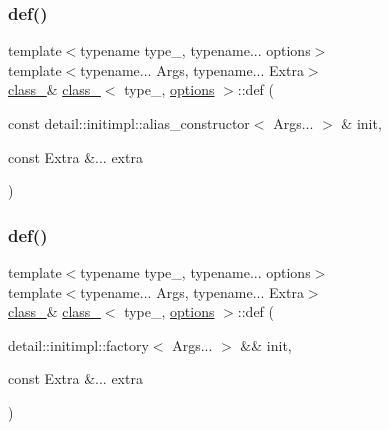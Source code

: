 \mbox{\label{classclass___aebf24734236ad776f18819d03c6b0e14}} 
\subsubsection{\texorpdfstring{def()}{def()}\hspace{0.1cm}{\footnotesize\ttfamily [4/6]}}
{\footnotesize\ttfamily template$<$typename type\+\_\+, typename... options$>$ \\
template$<$typename... Args, typename... Extra$>$ \\
\mbox{\hyperlink{classclass__}{class\+\_\+}}\& \mbox{\hyperlink{classclass__}{class\+\_\+}}$<$ type\+\_\+, \mbox{\hyperlink{classoptions}{options}} $>$\+::def (\begin{DoxyParamCaption}\item[{const detail\+::initimpl\+::alias\+\_\+constructor$<$ Args... $>$ \&}]{init,  }\item[{const Extra \&...}]{extra }\end{DoxyParamCaption})\hspace{0.3cm}{\ttfamily [inline]}}

\mbox{\label{classclass___ae0c7a19e6e278ec165edcfb60671b71f}} 
\subsubsection{\texorpdfstring{def()}{def()}\hspace{0.1cm}{\footnotesize\ttfamily [5/6]}}
{\footnotesize\ttfamily template$<$typename type\+\_\+, typename... options$>$ \\
template$<$typename... Args, typename... Extra$>$ \\
\mbox{\hyperlink{classclass__}{class\+\_\+}}\& \mbox{\hyperlink{classclass__}{class\+\_\+}}$<$ type\+\_\+, \mbox{\hyperlink{classoptions}{options}} $>$\+::def (\begin{DoxyParamCaption}\item[{detail\+::initimpl\+::factory$<$ Args... $>$ \&\&}]{init,  }\item[{const Extra \&...}]{extra }\end{DoxyParamCaption})\hspace{0.3cm}{\ttfamily [inline]}}

